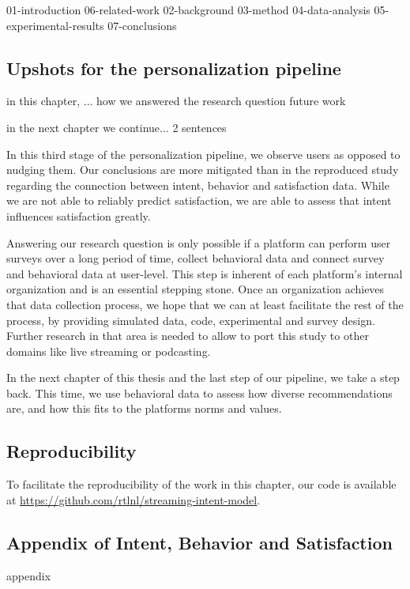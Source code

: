{01-introduction}
{06-related-work}
{02-background}
{03-method}
{04-data-analysis}
{05-experimental-results}
{07-conclusions}


\section{Upshots for the personalization pipeline}

in this chapter, ...
how we answered the research question
future work

in the next chapter we continue...
2 sentences
\fi

In this third stage of the personalization pipeline, we observe users as opposed to nudging them. Our conclusions are more mitigated than in the reproduced study~\cite{spotifyIntent} regarding the connection between intent, behavior and satisfaction data. While we are not able to reliably predict satisfaction, we are able to assess that intent influences satisfaction greatly.

Answering our research question is only possible if a platform can perform user surveys over a long period of time, collect behavioral data and connect survey and behavioral data at user-level. This step is inherent of each platform's internal organization and is an essential stepping stone. Once an organization achieves that data collection process, we hope that we can at least facilitate the rest of the process, by providing simulated data, code, experimental and survey design. Further research in that area is needed to allow to port this study to other domains like live streaming or podcasting.

In the next chapter of this thesis and the last step of our pipeline, we take a step back. This time, we use behavioral data to assess how diverse recommendations are, and how this fits to the platforms norms and values.

\section*{Reproducibility}
To facilitate the reproducibility of the work in this chapter, our code is available at \url{https://github.com/rtlnl/streaming-intent-model}.

\begin{appendices}
\chapter{Appendix of Intent, Behavior and Satisfaction}
{appendix}
\end{appendices}